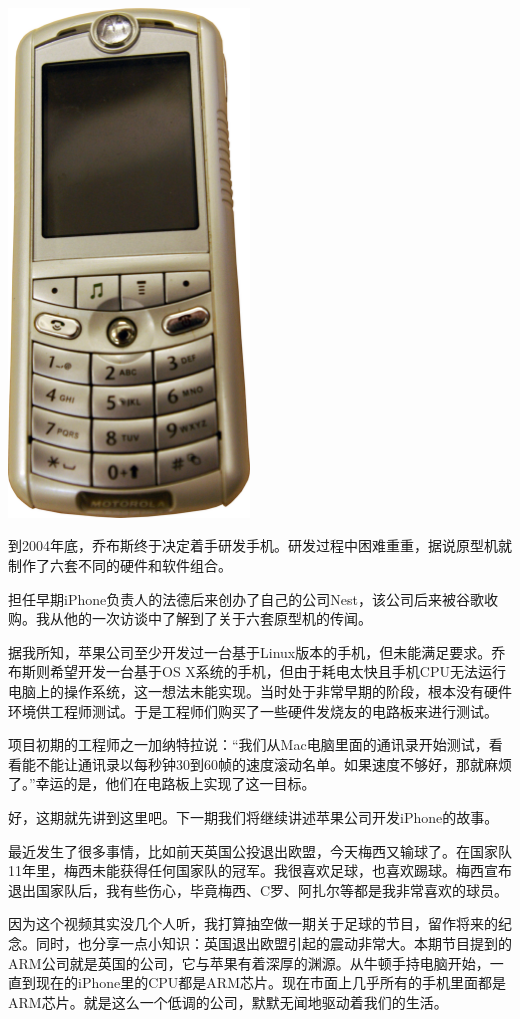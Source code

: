 \documentclass[
  letterpaper,
  DIV=11,
  numbers=noendperiod]{scrreprt}
\begin{document}
\includegraphics[width=2.52083in,height=\textheight,keepaspectratio]{img/Motorola_ROKR.png}

到2004年底，乔布斯终于决定着手研发手机。研发过程中困难重重，据说原型机就制作了六套不同的硬件和软件组合。

担任早期iPhone负责人的法德后来创办了自己的公司Nest，该公司后来被谷歌收购。我从他的一次访谈中了解到了关于六套原型机的传闻。

据我所知，苹果公司至少开发过一台基于Linux版本的手机，但未能满足要求。乔布斯则希望开发一台基于OS
X系统的手机，但由于耗电太快且手机CPU无法运行电脑上的操作系统，这一想法未能实现。当时处于非常早期的阶段，根本没有硬件环境供工程师测试。于是工程师们购买了一些硬件发烧友的电路板来进行测试。

项目初期的工程师之一加纳特拉说：``我们从Mac电脑里面的通讯录开始测试，看看能不能让通讯录以每秒钟30到60帧的速度滚动名单。如果速度不够好，那就麻烦了。''幸运的是，他们在电路板上实现了这一目标。

好，这期就先讲到这里吧。下一期我们将继续讲述苹果公司开发iPhone的故事。

最近发生了很多事情，比如前天英国公投退出欧盟，今天梅西又输球了。在国家队11年里，梅西未能获得任何国家队的冠军。我很喜欢足球，也喜欢踢球。梅西宣布退出国家队后，我有些伤心，毕竟梅西、C罗、阿扎尔等都是我非常喜欢的球员。

因为这个视频其实没几个人听，我打算抽空做一期关于足球的节目，留作将来的纪念。同时，也分享一点小知识：英国退出欧盟引起的震动非常大。本期节目提到的ARM公司就是英国的公司，它与苹果有着深厚的渊源。从牛顿手持电脑开始，一直到现在的iPhone里的CPU都是ARM芯片。现在市面上几乎所有的手机里面都是ARM芯片。就是这么一个低调的公司，默默无闻地驱动着我们的生活。
\end{document}
